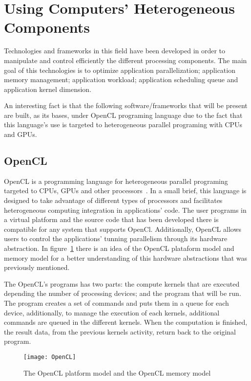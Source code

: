\section{Using Computers' Heterogeneous Components}\label{sec:computerheterogeneous}

Technologies and frameworks in this field have been developed in order to manipulate and control efficiently the different processing components. The main goal of this technologies is to optimize application parallelization; application memory management; application workload; application scheduling queue and application kernel dimension.

An interesting fact is that the following software/frameworks that will be present are built, as its bases, under OpenCL programing language due to the fact that this language's use is targeted to heterogeneous parallel programing with CPUs and GPUs.

\subsection{OpenCL}
OpenCL is a programming language for heterogeneous parallel programing targeted to CPUs, GPUs and other processors~\cite{Shen}. In a small brief,  this language is designed to take advantage of different types of processors and facilitates heterogeneous computing integration in applications' code. The user programs in a virtual platform and the source code that has been developed there is compatible for any system that supports OpenCl. Additionally, OpenCL allows users to control the applications' tunning parallelism through its hardware abstraction. In figure~\ref{fig:opcl} there is an idea of the OpenCL plataform model and memory model for a better understanding of this hardware abstractions that was previously mentioned.

The OpenCL's programs has two parts: the compute kernels that are executed depending the number of processing  devices; and the program that will be run. The program creates a set of commands and puts them in a queue for each device, additionally, to manage the execution of each kernels, additional commands are queued in the different kernels. When the computation is finished, the result data, from the previous kernels activity, return back to the original program. 

\begin{figure}[t]
  \begin{center}
    \leavevmode
    \texttt{[image: OpenCL]}
    \caption{The OpenCL platform model and the OpenCL memory model}
    \label{fig:opcl}
  \end{center}
\end{figure}

